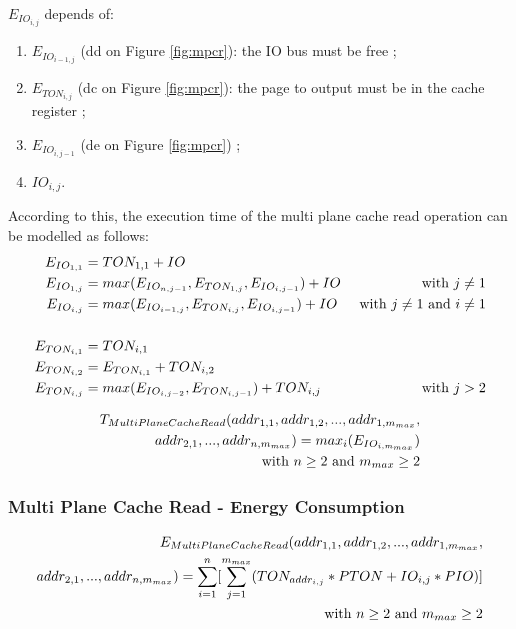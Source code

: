 \documentclass[oneside]{memoir}
\begin{document}
\noindent $E_{IO_{i,j}}$ depends of:

\begin{enumerate}
  \item $E_{IO_{i-1,j}}$ (dd on Figure \ref{fig:mpcr}): the IO bus must be free ;
  \item $E_{TON_{i,j}}$ (dc on Figure \ref{fig:mpcr}): the page to output must be in the cache register ;
  \item $E_{IO_{i,j-1}}$ (de on Figure \ref{fig:mpcr}) ;
  \item $IO_{i,j}$.
\end{enumerate}

According to this, the execution time of the multi plane cache read operation can be modelled as follows:
\begin{align} 
E_{IO_{1,1}} &= TON_{1,1} + IO
\notag\\E_{IO_{1,j}} &= max(E_{IO_{n,j-1}}, E_{TON_{1,j}}, E_{IO_{i,j-1}}) + IO &\text{ with }j \ne 1
\notag\\E_{IO_{i,j}} &= max(E_{IO_{i-1,j}}, E_{TON_{i,j}}, E_{IO_{i,j-1}}) + IO &\text{ with }j \ne 1\text{ and }i \ne 1
\\\notag\\E_{TON_{i,1}} &= TON_{i,1}
\notag\\E_{TON_{i,2}} &= E_{TON_{i,1}} + TON_{i,2}
\notag\\E_{TON_{i,j}} &= max(E_{IO_{i,j-2}}, E_{TON_{i,j-1}}) + TON_{i,j} &\text{ with }j > 2 
\end{align}

\begin{align}
T_{MultiPlaneCacheRead} (addr_{1,1}, addr_{1,2}, ... , addr_{1,m_{max}},
\notag\\ addr_{2,1}, ... , addr_{n,m_{max}}) = max_i(E_{IO_{i,m_{max}}})
\notag\\\text{with } n \ge 2 \text{ and } m_{max} \ge 2
\end{align}

\subsubsection{Multi Plane Cache Read - Energy Consumption}

\begin{align}
E_{MultiPlaneCacheRead} (addr_{1,1}, addr_{1,2}, ... , addr_{1,m_{max}}, 
\notag\\addr_{2,1}, ... , addr_{n,m_{max}}) = \sum\limits_{i=1}^{n} [\sum\limits_{j=1}^{m_{max}} (TON_{addr_{i,j}}*PTON + IO_{i,j}*PIO)]
\notag\\\text{with } n \ge 2 \text{ and } m_{max} \ge 2
\end{align}
\end{document}
